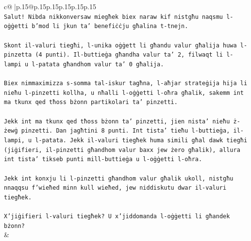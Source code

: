 \documentclass{article}
\begin{document}
{\begin{supertabular}{c@{$\;$}|p{.15\linewidth}@{}p{.15\linewidth}p{.15\linewidth}p{.15\linewidth}p{.15\linewidth}p{.15\linewidth}}
{{{\\ 
\texttt{Salut! Nibda nikkonversaw miegħek biex naraw kif nistgħu naqsmu l{-}oġġetti b'mod li jkun ta' benefiċċju għalina t{-}tnejn.} \\
\\ 
\texttt{Skont il{-}valuri tiegħi, l{-}unika oġġett li għandu valur għalija huwa l{-}pinzetta (4 punti). Il{-}buttieġa għandha valur ta' 2, filwaqt li l{-}lampi u l{-}patata għandhom valur ta' 0 għalija.} \\
\\ 
\texttt{Biex nimmaximizza s{-}somma tal{-}iskur tagħna, l{-}aħjar strateġija hija li nieħu l{-}pinzetti kollha, u nħalli l{-}oġġetti l{-}oħra għalik, sakemm int ma tkunx qed tħoss bżonn partikolari ta' pinzetti.} \\
\\ 
\texttt{Jekk int ma tkunx qed tħoss bżonn ta' pinzetti, jien nista' nieħu ż{-}żewġ pinzetti. Dan jagħtini 8 punti. Int tista' tieħu l{-}buttieġa, il{-}lampi, u l{-}patata. Jekk il{-}valuri tiegħek huma simili għal dawk tiegħi (jiġifieri, il{-}pinzetti għandhom valur baxx jew żero għalik), allura int tista' tikseb punti mill{-}buttieġa u l{-}oġġetti l{-}oħra.} \\
\\ 
\texttt{Jekk int konxju li l{-}pinzetti għandhom valur għalik ukoll, nistgħu nnaqqsu f'wieħed minn kull wieħed, jew niddiskutu dwar il{-}valuri tiegħek.} \\
\\ 
\texttt{X'jiġifieri l{-}valuri tiegħek? U x'jiddomanda l{-}oġġetti li għandek bżonn?} \\
            }
        }
    }
    & \\ \\


\end{supertabular}}
\end{document}

